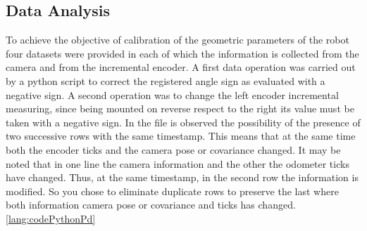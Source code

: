 \subsection{Data Analysis}
To achieve the objective of calibration of the geometric parameters of the robot four datasets were provided in each of which the information is collected from the camera and from the incremental encoder.
A first data operation was carried out by a python script to correct the registered angle sign as evaluated with a negative sign.
A second operation was to change the left encoder incremental measuring, since being mounted on reverse respect to the right its value must be taken with a negative sign.
In the file is observed the possibility of the presence of two successive rows with the same timestamp. 
This means that at the same time both the encoder ticks and the camera pose or covariance changed.
It may be noted that in one line the camera information and the other the odometer ticks have changed. 
Thus, at the same timestamp, in the second row the information is modified.
So you chose to eliminate duplicate rows to preserve the last where both information camera pose or covariance and ticks has changed.
\ref{lang:codePythonPd}